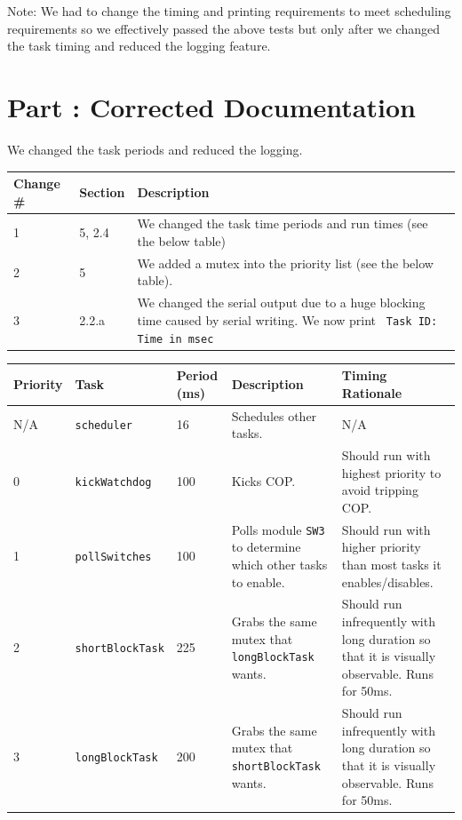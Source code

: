 \documentclass{article}
\newcounter{partNum}
\newcommand{\partNum}{%
        \stepcounter{partNum}%
        \thepartNum}
\newcommand{\sectPart}[1]{\section*{Part \partNum: #1}}
\begin{document}
Note: We had to change the timing and printing requirements to meet scheduling requirements so we effectively passed the above tests but only after we changed the task timing and reduced the logging feature.


\newpage

\sectPart{Corrected Documentation}

We changed the task periods and reduced the logging.

\begin{center}
	\begin{tabular}{l | l | p{35em}}
		Change \# & Section & Description \\ \hline
		1 & 5, 2.4 & We changed the task time periods and run times (see the below table) \\
		2 & 5 & We added a mutex into the priority list (see the below table). \\
		3 & 2.2.a & We changed the serial output due to a huge blocking time caused by serial writing. We now print
\texttt{ Task ID: Time in msec} \\
	\end{tabular}
\end{center} 
        
\vspace{1em}

\begin{center}
    \begin{tabular}{|l|l|l|p{10em}|p{10em}|}
        \hline
        \textbf{Priority} & \textbf{Task} & \textbf{Period (ms)} & \textbf{Description} & \textbf{Timing Rationale} \\ \hline
        N/A & \texttt{scheduler} & 16 & Schedules other tasks. & N/A \\ \hline
        0 & \texttt{kickWatchdog} & 100 & Kicks COP. & Should run with highest priority to avoid tripping COP. \\ \hline
        1 & \texttt{pollSwitches} & 100 & Polls module \texttt{SW3} to determine which other tasks to enable. & Should run with higher priority than most tasks it enables/disables. \\ \hline
        2 & \texttt{shortBlockTask} & 225 & Grabs the same mutex that \texttt{longBlockTask} wants. & Should run infrequently with long duration so that it is visually observable. Runs for 50ms. \\ \hline
        3 & \texttt{longBlockTask} & 200 & Grabs the same mutex that \texttt{shortBlockTask} wants. & Should run infrequently with long duration so that it is visually observable. Runs for 50ms. \\ \hline
    \end{tabular}
\end{center}
\end{document}

